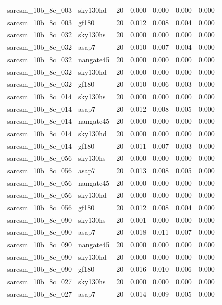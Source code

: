 \begin{tabular}{llrrrrr}
sarcsm\_10b\_8c\_003 & sky130hd & 20 & 0.000 & 0.000 & 0.000 & 0.000 \\
sarcsm\_10b\_8c\_003 & gf180 & 20 & 0.012 & 0.008 & 0.004 & 0.000 \\
sarcsm\_10b\_8c\_032 & sky130hs & 20 & 0.000 & 0.000 & 0.000 & 0.000 \\
sarcsm\_10b\_8c\_032 & asap7 & 20 & 0.010 & 0.007 & 0.004 & 0.000 \\
sarcsm\_10b\_8c\_032 & nangate45 & 20 & 0.000 & 0.000 & 0.000 & 0.000 \\
sarcsm\_10b\_8c\_032 & sky130hd & 20 & 0.000 & 0.000 & 0.000 & 0.000 \\
sarcsm\_10b\_8c\_032 & gf180 & 20 & 0.010 & 0.006 & 0.003 & 0.000 \\
sarcsm\_10b\_8c\_014 & sky130hs & 20 & 0.000 & 0.000 & 0.000 & 0.000 \\
sarcsm\_10b\_8c\_014 & asap7 & 20 & 0.012 & 0.008 & 0.005 & 0.000 \\
sarcsm\_10b\_8c\_014 & nangate45 & 20 & 0.000 & 0.000 & 0.000 & 0.000 \\
sarcsm\_10b\_8c\_014 & sky130hd & 20 & 0.000 & 0.000 & 0.000 & 0.000 \\
sarcsm\_10b\_8c\_014 & gf180 & 20 & 0.011 & 0.007 & 0.003 & 0.000 \\
sarcsm\_10b\_8c\_056 & sky130hs & 20 & 0.000 & 0.000 & 0.000 & 0.000 \\
sarcsm\_10b\_8c\_056 & asap7 & 20 & 0.013 & 0.008 & 0.005 & 0.000 \\
sarcsm\_10b\_8c\_056 & nangate45 & 20 & 0.000 & 0.000 & 0.000 & 0.000 \\
sarcsm\_10b\_8c\_056 & sky130hd & 20 & 0.000 & 0.000 & 0.000 & 0.000 \\
sarcsm\_10b\_8c\_056 & gf180 & 20 & 0.012 & 0.008 & 0.004 & 0.000 \\
sarcsm\_10b\_8c\_090 & sky130hs & 20 & 0.001 & 0.000 & 0.000 & 0.000 \\
sarcsm\_10b\_8c\_090 & asap7 & 20 & 0.018 & 0.011 & 0.007 & 0.000 \\
sarcsm\_10b\_8c\_090 & nangate45 & 20 & 0.000 & 0.000 & 0.000 & 0.000 \\
sarcsm\_10b\_8c\_090 & sky130hd & 20 & 0.000 & 0.000 & 0.000 & 0.000 \\
sarcsm\_10b\_8c\_090 & gf180 & 20 & 0.016 & 0.010 & 0.006 & 0.000 \\
sarcsm\_10b\_8c\_027 & sky130hs & 20 & 0.000 & 0.000 & 0.000 & 0.000 \\
sarcsm\_10b\_8c\_027 & asap7 & 20 & 0.014 & 0.009 & 0.005 & 0.000 \\

\end{tabular}

